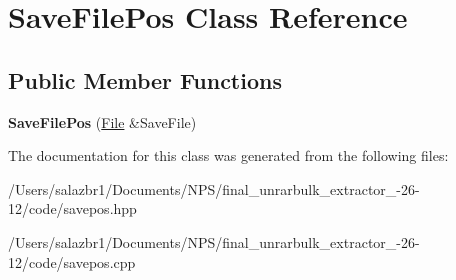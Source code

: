 \hypertarget{class_save_file_pos}{\section{Save\-File\-Pos Class Reference}
\label{class_save_file_pos}
}
\subsection*{Public Member Functions}
\begin{DoxyCompactItemize}
\item 
\hypertarget{class_save_file_pos_a3e69b682ceafcde3c91bce36f8a270f9}{{\bfseries Save\-File\-Pos} (\hyperlink{class_file}{File} \&Save\-File)}\label{class_save_file_pos_a3e69b682ceafcde3c91bce36f8a270f9}

\end{DoxyCompactItemize}


The documentation for this class was generated from the following files\-:\begin{DoxyCompactItemize}
\item 
/\-Users/salazbr1/\-Documents/\-N\-P\-S/final\-\_\-unrarbulk\-\_\-extractor\-\_-\/26-\/12/code/savepos.\-hpp\item 
/\-Users/salazbr1/\-Documents/\-N\-P\-S/final\-\_\-unrarbulk\-\_\-extractor\-\_-\/26-\/12/code/savepos.\-cpp\end{DoxyCompactItemize}
